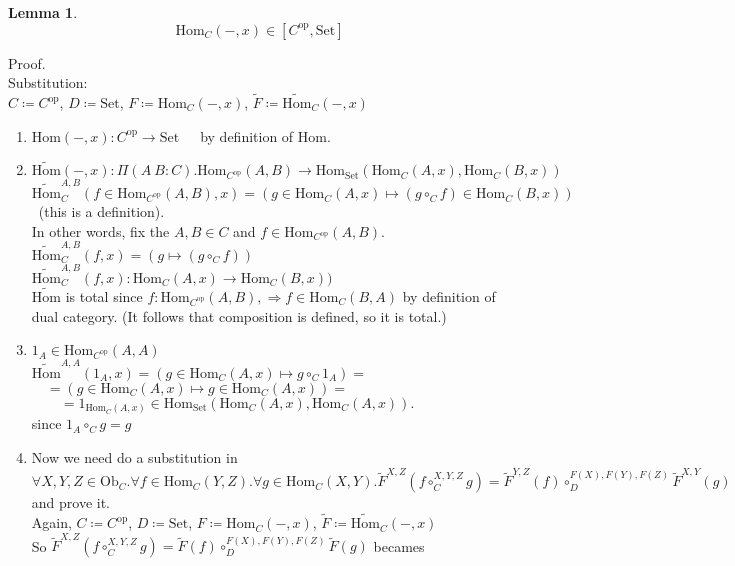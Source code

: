 \documentclass[10pt,a4paper]{article}
\theoremstyle{definition}
\newtheorem{lemma}{Lemma}[section]
\newcommand{\Ob}{{\mbox{Ob}}}
\newcommand{\Hom}{{\mbox{Hom}}}
\newcommand{\HomMor}{{\widetilde{\Hom}\mbox{}}}
\newcommand{\FMor}{{\widetilde{F}\mbox{}}}
\newcommand{\op}{{\mbox{op}}}
\newcommand{\Set}{{\mbox{Set}}}
\newcommand{\ra}{{\rightarrow}}
\begin{document}
\begin{lemma}
$$\Hom_C(-, x) \in [C^\op,\Set]$$
\end{lemma}

\noindent Proof.\\
Substitution:\\
$C \coloneqq C^\op$, 
$D \coloneqq \Set$, 
$F \coloneqq \Hom_C(-,x)$, 
$\FMor \coloneqq \HomMor_C(-,x)$\\
\begin{enumerate}
\item $\Hom(-, x) : C^\op \ra \Set$\ \ \ by definition of $\Hom$.
\item $\HomMor(-, x) :\Pi(A\ B:C).\Hom_{C^\op}(A,B) \ra \Hom_\Set(\Hom_C(A,x), \Hom_C(B,x))$\\
$\HomMor_C^{A,B}(f\in\Hom_{C^\op}(A,B), x) = (g \in\Hom_C(A,x) \mapsto (g \circ_C f) \in\Hom_C(B,x))$\ (this is a definition).\\
In other words, fix the $A,B\in C$ and $f\in\Hom_{C^\op}(A,B)$.\\
$\HomMor_C^{A,B}(f, x) = (g\mapsto (g \circ_C f))$\\
$\HomMor_C^{A,B}(f, x) : \Hom_C(A,x) \to \Hom_C(B,x))$
\\
$\HomMor$ is total since $f:\Hom_{C^\op}(A,B), \Rightarrow f\in\Hom_C(B,A)$ by definition of dual category. (It follows that composition is defined, so it is total.)
\item $1_A\in\Hom_{C^\op}(A,A)$\\
$\HomMor^{A,A}(1_A, x) = \left(g \in\Hom_C(A,x)\mapsto g \circ_C 1_A\right) = $\\
$\quad = \left(g \in\Hom_C(A,x) \mapsto g \in\Hom_C(A,x)\right) =$\\
$\quad \quad = 1_{\Hom_C(A,x)} \in \Hom_\Set\left(\Hom_C(A,x), \Hom_C(A,x)\right).$\\
since $1_A \circ_C g = g$\\
\item Now we need do a substitution in
$\forall X,Y,Z \in \Ob_C.\forall f\in\Hom_C(Y,Z).\forall g\in\Hom_C(X,Y). \FMor^{X,Z}(f\circ_C^{X,Y,Z} g)=\FMor^{Y,Z}(f)\circ_D^{F(X),F(Y),F(Z)} \FMor^{X,Y}(g)$ and prove it.\\
Again, $C \coloneqq C^\op$, 
$D \coloneqq \Set$, 
$F \coloneqq \Hom_C(-,x)$, 
$\FMor \coloneqq \HomMor_C(-,x)$\\
So $\FMor^{X,Z}(f\circ_C^{X,Y,Z} g)=\FMor(f)\circ_D^{F(X),F(Y),F(Z)} \FMor(g)$ becames\\

\end{enumerate}
\end{document}
